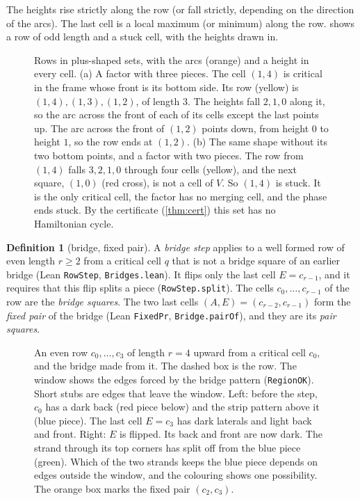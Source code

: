 \documentclass[11pt]{article}
\theoremstyle{plain}
\theoremstyle{definition}
\newtheorem{definition}[theorem]{Definition}
\theoremstyle{remark}
\newcommand{\lean}[1]{\texttt{#1}}
\begin{document}
The heights rise strictly along the row (or fall strictly, depending on the direction of the
arcs).
The last cell is a local maximum (or minimum) along the row.
 shows a row of odd length and a stuck cell, with the heights drawn in.

\begin{figure}[t]
\centering

\caption{Rows in plus-shaped sets, with the arcs (orange) and a height in every cell.
(a) A factor with three pieces.
The cell $(1,4)$ is critical in the frame whose front is its bottom side.
Its row (yellow) is $(1,4),(1,3),(1,2)$, of length $3$.
The heights fall $2,1,0$ along it, so the arc across the front of each of its cells except the last
points up.
The arc across the front of $(1,2)$ points down, from height $0$ to height $1$, so the row ends at
$(1,2)$.
(b) The same shape without its two bottom points, and a factor with two pieces.
The row from $(1,4)$ falls $3,2,1,0$ through four cells (yellow), and the next square, $(1,0)$
(red cross), is not a cell of $V$.
So $(1,4)$ is stuck.
It is the only critical cell, the factor has no merging cell, and the phase ends stuck.
By the certificate (\cref{thm:cert}) this set has no Hamiltonian cycle.}
\label{fig:row}
\end{figure}

\begin{definition}[bridge, fixed pair]
\label{def:bridge}
A \emph{bridge step} applies to a well formed row of even length $r\ge2$ from a critical cell $q$
that is not a bridge square of an earlier bridge (Lean \lean{RowStep}, \lean{Bridges.lean}).
It flips only the last cell $E=c_{r-1}$, and it requires that this flip splits a piece
(\lean{RowStep.split}).
The cells $c_0,\dots,c_{r-1}$ of the row are the \emph{bridge squares}.
The two last cells $(A,E)=(c_{r-2},c_{r-1})$ form the \emph{fixed pair} of the bridge (Lean
\lean{FixedPr}, \lean{Bridge.pairOf}), and they are its \emph{pair squares}.
\end{definition}

\begin{figure}[t]
\centering

\caption{An even row $c_0,\dots,c_3$ of length $r=4$ upward from a critical cell $c_0$, and the bridge
made from it.
The dashed box is the row.
The window shows the edges forced by the bridge pattern (\lean{RegionOK}).
Short stubs are edges that leave the window.
Left: before the step, $c_0$ has a dark back (red piece below) and the strip pattern above it
(blue piece).
The last cell $E=c_3$ has dark laterals and light back and front.
Right: $E$ is flipped.
Its back and front are now dark.
The strand through its top corners has split off from the blue piece (green).
Which of the two strands keeps the blue piece depends on edges outside the window, and the
colouring shows one possibility.
The orange box marks the fixed pair $(c_2,c_3)$.}
\label{fig:bridge}
\end{figure}
\end{document}
